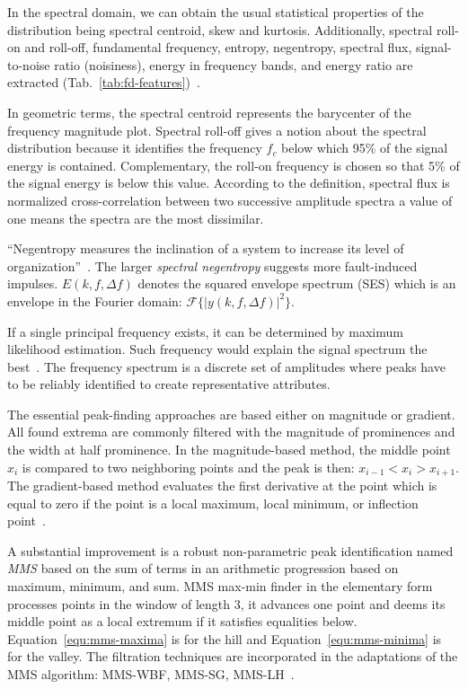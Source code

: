 In the spectral domain, we can obtain the usual statistical properties of the distribution being spectral centroid, skew and kurtosis. Additionally, spectral roll-on and roll-off, fundamental frequency, entropy, negentropy, spectral flux, signal-to-noise ratio (noisiness), energy in frequency bands, and energy ratio are extracted (Tab.~\ref{tab:fd-features})~\cite{peeters_large_2004}. 

In geometric terms, the spectral centroid represents the barycenter of the frequency magnitude plot. Spectral roll-off gives a notion about the spectral distribution because it identifies the frequency $f_c$ below which 95\% of the signal energy is contained. Complementary, the roll-on frequency is chosen so that 5\% of the signal energy is below this value. According to the definition, spectral flux is normalized cross-correlation between two successive amplitude spectra a value of one means the spectra are the most dissimilar.

``Negentropy measures the inclination of a system to increase its level of organization''~\cite{avoci_spectral_2020}. The larger \emph{spectral negentropy} suggests more fault-induced impulses. $E(k, f, \Delta f)$ denotes the squared envelope spectrum (SES) which is an envelope in the Fourier domain: $\mathcal{F}\{ |y(k, f, \Delta f)|^2 \}$.

If a single principal frequency exists, it can be determined by maximum likelihood estimation. Such frequency would explain the signal spectrum the best~\cite{peeters_large_2004}. The frequency spectrum is a discrete set of amplitudes where peaks have to be reliably identified to create representative attributes.

The essential peak-finding approaches are based either on magnitude or gradient. All found extrema are commonly filtered with the magnitude of prominences and the width at half prominence. In the magnitude-based method, the middle point $x_i$ is compared to two neighboring points and the peak is then: $x_{i-1} < x_i > x_{i+1}$. The gradient-based method evaluates the first derivative at the point which is equal to zero if the point is a local maximum, local minimum, or inflection point~\cite{adikaram_non-parametric_2016}.

A substantial improvement is a robust non-parametric peak identification named \emph{MMS} based on the sum of terms in an arithmetic progression based on maximum, minimum, and sum. MMS max-min finder in the elementary form processes points in the window of length 3, it advances one point and deems its middle point as a local extremum if it satisfies equalities below. Equation~\ref{equ:mms-maxima} is for the hill and Equation~\ref{equ:mms-minima} is for the valley. The filtration techniques are incorporated in the adaptations of the MMS algorithm: MMS-WBF, MMS-SG, MMS-LH~\cite{adikaram_non-parametric_2016}.

